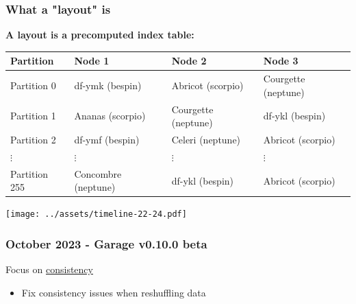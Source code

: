 \documentclass[aspectratio=169,xcolor={svgnames}]{beamer}
\begin{document}
\begin{frame}
	\frametitle{What a "layout" is}
		\textbf{A layout is a precomputed index table:}
		\vspace{1em}

		{\footnotesize
			\begin{center}
			\begin{tabular}{|l|l|l|l|}
				\hline
				\textbf{Partition} & \textbf{Node 1} & \textbf{Node 2} & \textbf{Node 3} \\
				\hline
				\hline
				Partition 0 & df-ymk (bespin) & Abricot (scorpio) & Courgette (neptune) \\
				\hline
				Partition 1 & Ananas (scorpio) & Courgette (neptune) & df-ykl (bespin) \\
				\hline
				Partition 2 & df-ymf (bespin) & Celeri (neptune) & Abricot (scorpio) \\
				\hline
				\hspace{1em}$\vdots$ & \hspace{1em}$\vdots$ & \hspace{1em}$\vdots$ & \hspace{1em}$\vdots$ \\
				\hline
				Partition 255 & Concombre (neptune) & df-ykl (bespin) & Abricot (scorpio) \\
				\hline
			\end{tabular}
			\end{center}
		}

	\vspace{2em}

	\vspace{1em}
\end{frame}




\begin{frame}
	\begin{center}
		\texttt{[image: ../assets/timeline-22-24.pdf]}
	\end{center}
\end{frame}

\begin{frame}
	\frametitle{October 2023 - Garage v0.10.0 beta}
	Focus on \underline{consistency}
	\vspace{2em}
	\begin{itemize}
		\item Fix consistency issues when reshuffling data
	\end{itemize}
\end{frame}
\end{document}
